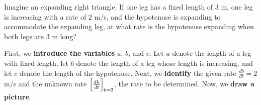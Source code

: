 \documentclass{ximera}
\begin{document}
\begin{example}
  Imagine an expanding right triangle. If one leg has a fixed length
  of $3$ m, one leg is increasing with a rate of $2$ m/s, and the
  hypotenuse is expanding to accommodate the expanding leg, at what
  rate is the hypotenuse expanding when both legs are $3$ m long?
  \begin{explanation}
 First, we \textbf{introduce the variables}  $a$, $b$, and $c$. Let $a$ denote the length of a leg with fixed length, let $b$ denote the length of a leg whose length is increasing, 
 and  let $c$ denote the length of the hypotenuse. Next, we \textbf{identify} the given rate $\frac{db}{dt}=2$ m/s and the unknown rate $\Bigl[\frac{dh}{dt}\Bigr]_{b=3}$, the rate to be determined.
   Now, we \textbf{draw a picture}.
    \begin{image}
    \end{image}


\end{explanation}
\end{example}
\end{document}
